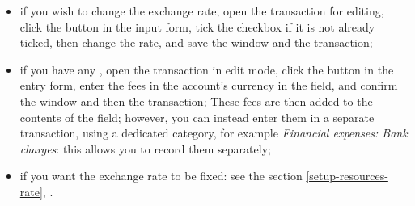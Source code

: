 \begin{itemize}
	\Note{}: you can reverse the direction of the conversion (one pound sterling is worth X Currency, or one Currency is worth Y pounds sterling) by swapping the names of the currencies in the two drop-down lists; this allows you to enter the exchange rate exactly as it has been provided to you; this rate can be adjusted at any time after the transaction has been created.
	\item if you wish to change the exchange rate, open the transaction for editing, click the  button in the input form, tick the  checkbox if it is not already ticked, then change the rate, and save the window and the transaction;
	\item if you have any , open the transaction in edit mode, click the  button in the entry form, enter the fees in the account’s currency in the  field, and confirm the window and then the transaction; These fees are then added to the contents of the  field; however, you can instead enter them in a separate transaction, using a dedicated category, for example \emph{Financial expenses: Bank charges}: this allows you to record them separately;
	\item if you want the exchange rate to be fixed: see the section \vref{setup-resources-rate}, .
\end{itemize}


